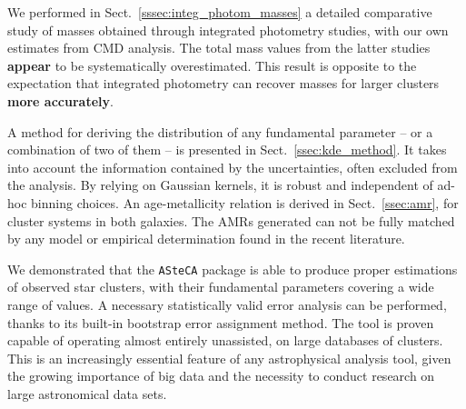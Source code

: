 \documentclass[referee]{aa}
\begin{document}
We performed in Sect.~\ref{sssec:integ_photom_masses} a detailed comparative
study of masses obtained through integrated photometry studies, with our own
estimates from CMD analysis.
The total mass values from the latter studies \textbf{appear} to be
systematically overestimated. This result is opposite to the expectation that
integrated photometry can recover masses for larger clusters \textbf{more
accurately}.

A method for deriving the distribution of any fundamental parameter -- or a
combination of two of them -- is presented in Sect.~\ref{ssec:kde_method}. It
takes into account the information contained by the uncertainties, often
excluded from the analysis. By relying on Gaussian kernels, it is robust and
independent of ad-hoc binning choices.
%
An age-metallicity relation is derived in Sect.~\ref{ssec:amr}, for
cluster systems in both galaxies. The AMRs generated can not be fully matched by
any model or empirical determination found in the recent literature.

We demonstrated that the \texttt{ASteCA} package is able to produce proper
estimations of observed star clusters, with their fundamental parameters
covering a wide range of values. A necessary statistically valid error analysis
can be performed, thanks to its built-in bootstrap error assignment method.
%
The tool is proven capable of operating almost entirely unassisted, on large
databases of clusters. This is an increasingly essential feature
of any astrophysical analysis tool, given the growing importance of big data and
the necessity to conduct research on large astronomical data sets.




\end{document}
